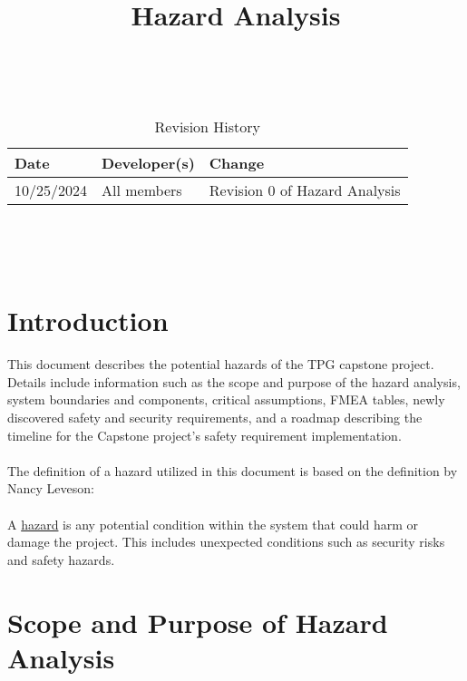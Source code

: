 \documentclass{article}
\title{Hazard Analysis\\\progname}
\author{\authname}
\date{}
\begin{document}
\maketitle
\thispagestyle{empty}

~\newpage


\begin{table}[hp]
\caption{Revision History} \label{TblRevisionHistory}
\begin{tabularx}{\textwidth}{llX}
\toprule
\textbf{Date} & \textbf{Developer(s)} & \textbf{Change}\\
\midrule
10/25/2024 & All members & Revision 0 of Hazard Analysis\\
\bottomrule
\end{tabularx}
\end{table}

~\newpage

\tableofcontents

~\newpage



\section{Introduction}


This document describes the potential hazards of the TPG capstone project. Details include information such as the scope and purpose of the hazard analysis, system boundaries and components, critical assumptions, FMEA tables, newly discovered safety and security requirements, and a roadmap describing the timeline for the Capstone project’s safety requirement implementation. 
\\\\
The definition of a hazard utilized in this document is based on the definition by Nancy Leveson: 
\\\\
A \underline{hazard} is any potential condition within the system that could harm or damage the project. This includes unexpected conditions such as security risks and safety hazards. 

\section{Scope and Purpose of Hazard Analysis}
\end{document}
